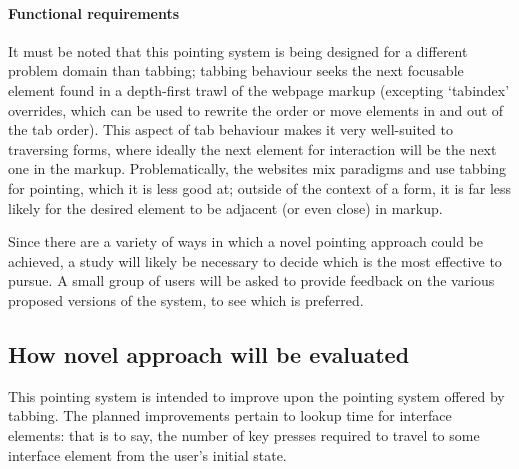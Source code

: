 \documentclass[a4paper, 11pt]{article}
\begin{document}
\paragraph{Functional requirements}
\begin{itemize}
\end{itemize}

It must be noted that this pointing system is being designed for a different problem domain than tabbing; tabbing behaviour seeks the next focusable element found in a depth-first trawl of the webpage markup (excepting `tabindex' overrides, which can be used to rewrite the order or move elements in and out of the tab order). This aspect of tab behaviour makes it very well-suited to traversing forms, where ideally the next element for interaction will be the next one in the markup. Problematically, the websites mix paradigms and use tabbing for pointing, which it is less good at; outside of the context of a form, it is far less likely for the desired element to be adjacent (or even close) in markup.

Since there are a variety of ways in which a novel pointing approach could be achieved, a study will likely be necessary to decide which is the most effective to pursue. A small group of users will be asked to provide feedback on the various proposed versions of the system, to see which is preferred.

\subsection{How novel approach will be evaluated}\label{evaluationsec}
This pointing system is intended to improve upon the pointing system offered by tabbing.
The planned improvements pertain to lookup time for interface elements: that is to say, the number of key presses required to travel to some interface element from the user's initial state.
\end{document}
